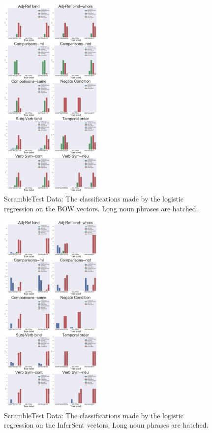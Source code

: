 \documentclass[10pt,letterpaper]{article}
\begin{document}
\begin{figure}[ht!]
\centering
\includegraphics[width=0.45\textwidth]{AllHistsBOWLogReg.png}
\caption{ScrambleTest Data: The classifications made by the logistic regression on the BOW vectors. Long noun phrases are hatched.}
\label{fig:BOWhistLR}
\end{figure}



\begin{figure}[ht!]
\centering
\includegraphics[width=0.45\textwidth]{AllHistsInferSentLogReg.png}
\caption{ScrambleTest Data: The classifications made by the logistic regression on the InferSent vectors. Long noun phrases are hatched.}
\label{fig:IShistLR}
\end{figure}
\end{document}
